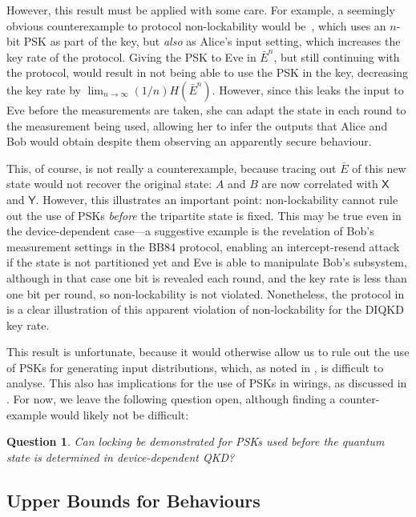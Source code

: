 \documentclass[10pt, a4paper]{article}
\numberwithin{equation}{section} %
\theoremstyle{definition}
\theoremstyle{plain}
\newtheorem{question}{Question}
\newcommand{\?}{\mathrel{?}} %
\newcommand{\crv}[1]{\mathsf{#1}}
\begin{document}
    However, this result must be applied with some care. For example, a seemingly obvious counterexample to protocol non-lockability would be~\cite[Prot. 2]{DIQKD_FiniteSize}, which uses an \(n\)-bit PSK as part of the key, but \emph{also} as Alice's input setting, which increases the key rate of the protocol. Giving the PSK to Eve in \(\bar{E}^n\), but still continuing with the protocol, would result in not being able to use the PSK in the key, decreasing the key rate by \(\lim_{n\to\infty} (1/n) H(\bar{E}^n)\). However, since this leaks the input to Eve before the measurements are taken, she can adapt the state in each round to the measurement being used, allowing her to infer the outputs that Alice and Bob would obtain despite them observing an apparently secure behaviour.

    This, of course, is not really a counterexample, because tracing out \(\bar{E}\) of this new state would not recover the original state: \(A\) and \(B\) are now correlated with \(\crv{X}\) and \(\crv{Y}\). However, this illustrates an important point: non-lockability cannot rule out the use of PSKs \emph{before} the tripartite state is fixed. This may be true even in the device-dependent case---a suggestive example is the revelation of Bob's measurement settings in the BB84 protocol, enabling an intercept-resend attack~\cite{PracticalQKD} if the state is not partitioned yet and Eve is able to manipulate Bob's subsystem, although in that case one bit is revealed each round, and the key rate is less than one bit per round, so non-lockability is not violated. Nonetheless, the protocol in~\cite[Prot. 2]{DIQKD_FiniteSize} is a clear illustration of this apparent violation of non-lockability for the DIQKD key rate.

    This result is unfortunate, because it would otherwise allow us to rule out the use of PSKs for generating input distributions, which, as noted in , is difficult to analyse. This also has implications for the use of PSKs in wirings, as discussed in . For now, we leave the following question open, although finding a counter-example would likely not be difficult:
    \begin{question}
      Can locking be demonstrated for PSKs used before the quantum state is determined in device-dependent QKD\@?
    \end{question}

    \subsection{Upper Bounds for Behaviours}\label{sec:diqkd_ubehav}
\end{document}
